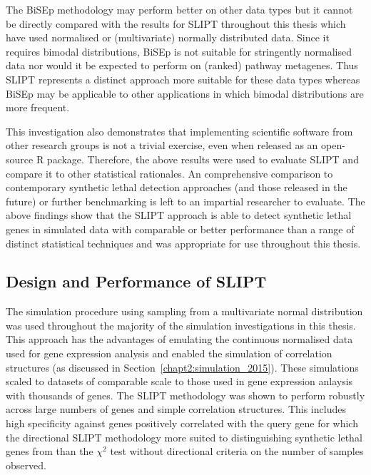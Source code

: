 The \gls{BiSEp} methodology may perform better on other data types but it cannot be directly compared with the results for \gls{SLIPT} throughout this thesis which have used normalised or (multivariate) normally distributed data. Since it requires bimodal distributions, \gls{BiSEp} is not suitable for stringently normalised  data nor would it be expected to perform on (ranked) pathway \glspl{metagene}. Thus \gls{SLIPT} represents a distinct approach more suitable for these data types whereas \gls{BiSEp} may be applicable to other applications in which bimodal distributions are more frequent.

This investigation also demonstrates that implementing scientific software from other research groups is not a trivial exercise, even when released as an open-source R package. Therefore, the above results were used to evaluate \gls{SLIPT} and compare it to other statistical rationales. An comprehensive comparison to contemporary \gls{synthetic lethal} detection approaches (and those released in the future) or further benchmarking is left to an impartial researcher to evaluate. The above findings show that the \gls{SLIPT} approach is able to detect \gls{synthetic lethal} genes in simulated data with comparable or better performance than a range of distinct statistical techniques and was appropriate for use throughout this thesis.  

\subsection{Design and Performance of SLIPT}

The simulation procedure using sampling from a multivariate normal distribution was used throughout the majority of the simulation investigations in this thesis. This approach has the advantages of emulating the continuous normalised  data used for \gls{gene expression} analysis and enabled the simulation of correlation structures (as discussed in Section~\ref{chapt2:simulation_2015}). These simulations scaled to datasets of comparable scale to those used in \gls{gene expression} anlaysis with thousands of genes. The \gls{SLIPT} methodology was shown to perform robustly across large numbers of genes and simple correlation structures. This includes high specificity against genes positively correlated with the query gene for which the directional \gls{SLIPT} methodology more suited to distinguishing \gls{synthetic lethal} genes from than the $\chi^2$ test without directional criteria on the number of samples observed.

